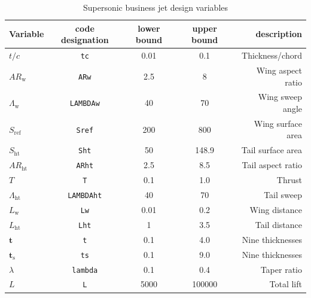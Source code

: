 \documentclass[11pt]{article}
\begin{document}
\begin{table}[h!]
  \centering
  \renewcommand{\arraystretch}{1.0}%
  \small\addtolength{\tabcolsep}{-1pt}
  \caption{Supersonic business jet design variables}
  \label{table:parameters}
  \begin{tabular}{lcccr}
    \hline\hline
    \bf Variable            & \bf code designation  & \bf lower bound & \bf upper bound & \bf description           \\ \hline
    $t/c$                   & \texttt{tc}           & 0.01      	 		& 0.1     		    & Thickness/chord           \\
    $AR_{\text{w}}$ 	      & \texttt{ARw}          & 2.5             & 8         	    & Wing aspect ratio         \\
    $\Lambda_{\text{w}}$ 		& \texttt{LAMBDAw}      & 40					    & 70    	  	    & Wing sweep angle          \\
    $S_{\text{ref}}$ 	      & \texttt{Sref}         & 200					    & 800   	  	    & Wing surface area         \\
    $S_{\text{ht}}$ 			  & \texttt{Sht}          & 50				      & 148.9		  	    & Tail surface area         \\
    $AR_{\text{ht}}$  			& \texttt{ARht}         & 2.5			        & 8.5   	  	    & Tail aspect ratio         \\
    $T$ 				            & \texttt{T}            & 0.1		 			    & 1.0    		      & Thrust                    \\
    $\Lambda_\text{ht}$ 	  & \texttt{LAMBDAht}     & 40              & 70    		  	  & Tail sweep                \\
    $L_{\text{w}}$ 				  & \texttt{Lw}           & 0.01            & 0.2    		      & Wing distance             \\
    $L_{\text{ht}}$ 				& \texttt{Lht}          & 1               & 3.5    		      & Tail distance             \\
    $\mathbf{t}$ 			      & \texttt{t}            & 0.1             & 4.0    		      & Nine thicknesses          \\
    $\mathbf{t}_{\text{s}}$ & \texttt{ts}           & 0.1             & 9.0    		      & Nine thicknesses          \\
    $\lambda$ 	            & \texttt{lambda}       & 0.1             & 0.4    		  	  & Taper ratio               \\
    $L$ 				            & \texttt{L}            & 5000            & 100000    		  & Total lift                \\

\end{tabular}
\end{table}
\end{document}
